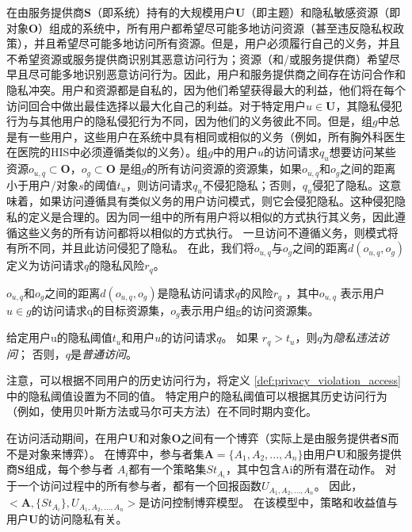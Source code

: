 在由服务提供商$\mathbf{S}$（即系统）持有的大规模用户$\mathbf{U}$（即主题）和隐私敏感资源（即对象$\mathbf{O}$）组成的系统中，所有用户都希望尽可能多地访问资源（甚至违反隐私权政策），并且希望尽可能多地访问所有资源。但是，用户必须履行自己的义务，并且不希望资源或服务提供商识别其恶意访问行为；资源（和/或服务提供商）希望尽早且尽可能多地识别恶意访问行为。因此，用户和服务提供商之间存在访问合作和隐私冲突。用户和资源都是自私的，因为他们希望获得最大的利益，他们将在每个访问回合中做出最佳选择以最大化自己的利益。对于特定用户$u \in \mathbf{U}$，其隐私侵犯行为与其他用户的隐私侵犯行为不同，因为他们的义务彼此不同。但是，组$g$中总是有一些用户，这些用户在系统中具有相同或相似的义务（例如，所有胸外科医生在医院的HIS中必须遵循类似的义务）。组$g$中的用户$u$的访问请求$q_u$想要访问某些资源$o_{u,q} \subset \mathbf{O}$，$o_{g} \subset \mathbf{O}$ 是组$g$的所有访问资源的资源集，如果$o_{u,q}$和$o_{g}$之间的距离小于用户/对象$s$的阈值$t_u$，则访问请求$q_u$不侵犯隐私；否则，$q_u$侵犯了隐私。这意味着，如果访问遵循具有类似义务的用户访问模式，则它会侵犯隐私。这种侵犯隐私的定义是合理的。因为同一组中的所有用户将以相似的方式执行其义务，因此遵循这些义务的所有访问都将以相似的方式执行。 一旦访问不遵循义务，则模式将有所不同，并且此访问侵犯了隐私。 在此，我们将$o_{u,q}$与$o_{g}$之间的距离$d(o_{u,q},o_{g})$定义为访问请求$q$的隐私风险$r_q$。
\begin{definition}
	\label{def:privacy_risk}
	$o_{u,q}$和$o_{g}$之间的距离$d(o_{u,q},o_{g})$是隐私访问请求$q$的风险$r_q$ ，其中$o_{u,q}$ 表示用户$u \in g$的访问请求q的目标资源集，$o_{g}$表示用户组g的访问资源集。
\end{definition}

\begin{definition}
	\label{def:privacy_violation_access}
	
	给定用户u的隐私阈值$t_u$和用户$u$的访问请求$q$。 如果 $r_q > t_u$，则$q$为\textit{隐私违法访问}； 否则，$q$是\textit{普通访问}。
\end{definition}



注意，可以根据不同用户的历史访问行为，将定义 \ref{def:privacy_violation_access}中的隐私阈值设置为不同的值。 特定用户的隐私阈值可以根据其历史访问行为（例如，使用贝叶斯方法或马尔可夫方法）在不同时期内变化。

在访问活动期间，在用户$\mathbf{U}$和对象$\mathbf{O}$之间有一个博弈（实际上是由服务提供者$\mathbf{S}$而不是对象来博弈）。 在博弈中，参与者集$\mathbf{A}=\{A_1,A_2,...,A_n\}$由用户$\mathbf{U}$和服务提供商$\mathbf{S}$组成，每个参与者 $A_i$都有一个策略集$St_{A_i}$，其中包含Ai的所有潜在动作。 对于一个访问过程中的所有参与者，都有一个回报函数$U_{A_1,A_2,...,A_n}$。 因此，$<\mathbf{A},\{St_{A_i}\},U_{A_1,A_2,...,A_n}>$是访问控制博弈模型。 在该模型中，策略和收益值与用户$\mathbf{U}$的访问隐私有关。

